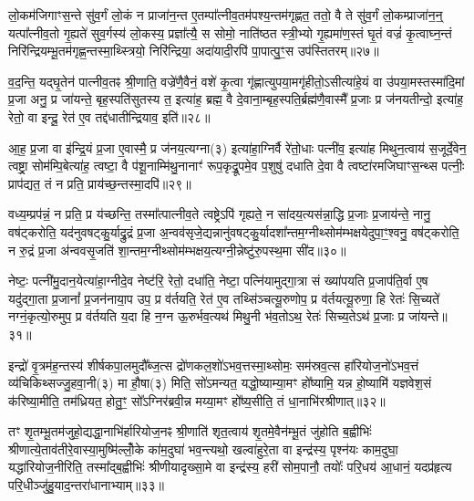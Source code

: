 लो॒कम॑जिगाꣳस॒न्ते सु॑व॒र्गं लो॒कं न प्राजा॑न॒न्त ए॒तम्पा᳚त्नीव॒तम॑पश्य॒न्तम॑गृह्णत॒ ततो॒ वै ते सु॑व॒र्गं लो॒कम्प्राजा॑न॒न्॒ यत्पा᳚त्नीव॒तो गृ॒ह्यते॑ सुव॒र्गस्य॑ लो॒कस्य॒ प्रज्ञा᳚त्यै॒ स सोमो॒ नाति॑ष्ठत स्त्री॒भ्यो गृ॒ह्यमा॑ण॒स्तं घृ॒तं वज्रं॑ कृ॒त्वाघ्न॒न्तं निरि॑न्द्रियम्भू॒तम॑गृह्ण॒न्तस्मा॒थ्स्त्रियो॒ निरि॑न्द्रिया॒ अदा॑यादी॒रपि॑ पा॒पात्पु॒ꣳ॒स उप॑स्तितरम्॥२७॥

व॒द॒न्ति॒ यद्घृ॒तेन॑ पात्नीव॒तꣴ श्री॒णाति॒ वज्रे॑णै॒वैनं॒ वशे॑ कृ॒त्वा गृ॑ह्णात्युपया॒मगृ॑हीतो॒\-ऽसीत्या॑हे॒यं वा उ॑पया॒मस्तस्मा॑दि॒मां प्र॒जा अनु॒ प्र जा॑यन्ते॒ बृह॒स्पति॑सुतस्य त॒ इत्या॑ह॒ ब्रह्म॒ वै दे॒वाना॒म्बृह॒स्पति॒र्ब्रह्म॑णै॒वास्मै᳚ प्र॒जाः प्र ज॑नयतीन्दो॒ इत्या॑ह॒ रेतो॒ वा इन्दू॒ रेत॑ ए॒व तद्द॑धातीन्द्रियाव॒ इति॑॥२८॥

आ॒ह॒ प्र॒जा वा इ॑न्द्रि॒यं प्र॒जा ए॒वास्मै॒ प्र ज॑नय॒त्यग्ना(३) इत्या॑हा॒ग्निर्वै रे॑तो॒धाः पत्नी॑व॒ इत्या॑ह मिथुन॒त्वाय॑ स॒जूर्दे॒वेन॒ त्वष्ट्रा॒ सोम॑म्पि॒बेत्या॑ह॒ त्वष्टा॒ वै प॑शू॒नाम्मि॑थु॒नानाꣳ॑ रूप॒कृद्रू॒पमे॒व प॒शुषु॑ दधाति दे॒वा वै त्वष्टा॑रमजिघाꣳस॒न्थ्स पत्नीः॒ प्राप॑द्यत॒ तं न प्रति॒ प्राय॑च्छ॒न्तस्मा॒दपि॑॥२९॥

वध्य॒म्प्रप॑न्नं॒ न प्रति॒ प्र य॑च्छन्ति॒ तस्मा᳚त्पात्नीव॒ते त्वष्ट्रे\-ऽपि॑ गृह्यते॒ न सा॑दय॒त्यस॑न्ना॒द्धि प्र॒जाः प्र॒जाय॑न्ते॒ नानु॒ वष॑ट्करोति॒ यद॑नुवषट्कु॒र्याद्रु॒द्रं प्र॒जा अ॒न्वव॑सृजे॒द्यन्नानु॑वषट्कु॒र्यादशा᳚न्तम॒ग्नीथ्सोम॑म्भक्षयेदुपा॒ꣳ॒श्वनु॒ वष॑ट्करोति॒ न रु॒द्रं प्र॒जा अ॑न्ववसृ॒जति॑ शा॒न्तम॒ग्नीथ्सोम॑म्भक्षय॒त्यग्नी॒न्नेष्टु॑रु॒पस्थ॒मा सी॑द॥३०॥

नेष्टः॒ पत्नी॑मु॒दान॒येत्या॑हा॒ग्नीदे॒व नेष्ट॑रि॒ रेतो॒ दधा॑ति॒ नेष्टा॒ पत्नि॑यामुद्गा॒त्रा सं ख्या॑पयति प्र॒जाप॑ति॒र्वा ए॒ष यदु॑द्गा॒ता प्र॒जानां᳚ प्र॒जन॑नाया॒प उप॒ प्र व॑र्तयति॒ रेत॑ ए॒व तथ्सि॑ञ्चत्यू॒रुणोप॒ प्र व॑र्तयत्यू॒रुणा॒ हि रेतः॑ सि॒च्यते॑ नग्नं॒कृत्यो॒रुमुप॒ प्र व॑र्तयति य॒दा हि न॒ग्न ऊ॒रुर्भव॒त्यथ॑ मिथु॒नी भ॑व॒तो\-ऽथ॒ रेतः॑ सिच्य॒ते\-ऽथ॑ प्र॒जाः प्र जा॑यन्ते॥३१॥

{\anuvakamend[{पत्नीः᳚ सुव॒र्गमुप॑स्तितरमिन्द्रियाव॒ इत्यपि॑ सीद मिथु॒न्य॑ष्टौ च॑॥८॥}]}

इन्द्रो॑ वृ॒त्रम॑ह॒न्तस्य॑ शीर्\mbox{}षकपा॒लमुदौ᳚ब्ज॒त्स द्रो॑णकल॒शो॑\-ऽभव॒त्तस्मा॒थ्सोमः॒ सम॑स्रव॒त्स हा॑रियोज॒नो॑\-ऽभव॒त्तं व्य॑चिकिथ्सज्जु॒हवा॒नी(३) मा हौ॒षा(३) मिति॒ सो॑\-ऽमन्यत॒ यद्धो॒ष्याम्या॒मꣳ हो᳚ष्यामि॒ यन्न हो॒ष्यामि॑ यज्ञवेश॒सं क॑रिष्या॒मीति॒ तम॑ध्रियत॒ होतु॒ꣳ॒ सो᳚\-ऽग्निर॑ब्रवी॒न्न मय्या॒मꣳ हो᳚ष्य॒सीति॒ तं धा॒नाभि॑रश्रीणात्॥३२॥

तꣳ शृ॒तम्भू॒तम॑जुहो॒द्यद्धा॒नाभि॑र्\mbox{}हारियोज॒नꣴ श्री॒णाति॑ शृत॒त्वाय॑ शृ॒तमे॒वैन॑म्भू॒तं जु॑होति ब॒ह्वीभिः॑ श्रीणात्ये॒ताव॑ती\-रे॒वास्या॒मुष्मि॑ल्लोँ॒के का॑म॒दुघा॑ भव॒न्त्यथो॒ खल्वा॑हुरे॒ता वा इन्द्र॑स्य॒ पृश्न॑यः काम॒दुघा॒ यद्धा॑रियोज॒नीरिति॒ तस्मा᳚द्ब॒ह्वीभिः॑ श्रीणीयादृख्सा॒मे वा इन्द्र॑स्य॒ हरी॑ सोम॒पानौ॒ तयोः᳚ परि॒धय॑ आ॒धानं॒ यदप्र॑हृत्य परि॒धीञ्जु॑हु॒याद॒न्तरा॑धानाभ्याम्॥३३॥

